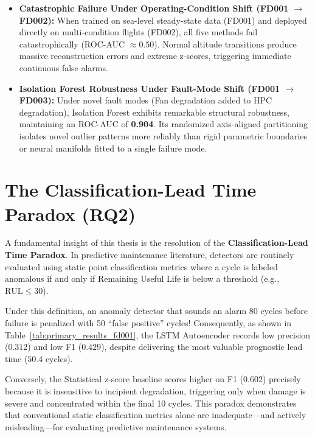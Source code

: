 \documentclass[12pt,a4paper,oneside]{report}
\begin{document}
\begin{itemize}
    \item \textbf{Catastrophic Failure Under Operating-Condition Shift (FD001 $\rightarrow$ FD002):} When trained on sea-level steady-state data (FD001) and deployed directly on multi-condition flights (FD002), all five methods fail catastrophically (ROC-AUC $\approx 0.50$). Normal altitude transitions produce massive reconstruction errors and extreme z-scores, triggering immediate continuous false alarms.
    \item \textbf{Isolation Forest Robustness Under Fault-Mode Shift (FD001 $\rightarrow$ FD003):} Under novel fault modes (Fan degradation added to HPC degradation), Isolation Forest exhibits remarkable structural robustness, maintaining an ROC-AUC of \textbf{0.904}. Its randomized axis-aligned partitioning isolates novel outlier patterns more reliably than rigid parametric boundaries or neural manifolds fitted to a single failure mode.
\end{itemize}

\section{The Classification-Lead Time Paradox (RQ2)}
A fundamental insight of this thesis is the resolution of the \textbf{Classification-Lead Time Paradox}. In predictive maintenance literature, detectors are routinely evaluated using static point classification metrics where a cycle is labeled anomalous if and only if Remaining Useful Life is below a threshold (e.g., $\text{RUL} \le 30$). 

Under this definition, an anomaly detector that sounds an alarm 80 cycles before failure is penalized with 50 ``false positive'' cycles! Consequently, as shown in Table~\ref{tab:primary_results_fd001}, the LSTM Autoencoder records low precision ($0.312$) and low F1 ($0.429$), despite delivering the most valuable prognostic lead time ($50.4$ cycles). 

Conversely, the Statistical z-score baseline scores higher on F1 ($0.602$) precisely because it is insensitive to incipient degradation, triggering only when damage is severe and concentrated within the final 10 cycles. This paradox demonstrates that conventional static classification metrics alone are inadequate—and actively misleading—for evaluating predictive maintenance systems.
\end{document}
